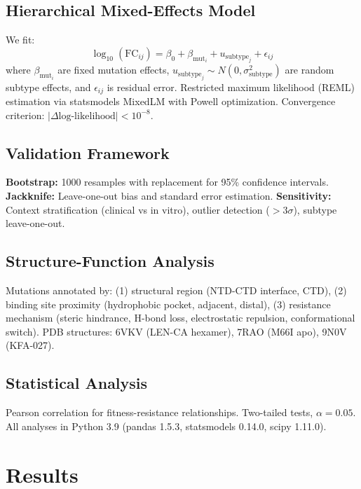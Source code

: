 \documentclass[preprint]{elsarticle}
\begin{document}
\subsection{Hierarchical Mixed-Effects Model}

We fit:
\begin{equation}
\log_{10}(\text{FC}_{ij}) = \beta_0 + \beta_{\text{mut}_i} + u_{\text{subtype}_j} + \epsilon_{ij}
\end{equation}
where $\beta_{\text{mut}_i}$ are fixed mutation effects, $u_{\text{subtype}_j} \sim N(0, \sigma^2_{\text{subtype}})$ are random subtype effects, and $\epsilon_{ij}$ is residual error. Restricted maximum likelihood (REML) estimation via statsmodels MixedLM with Powell optimization. Convergence criterion: $|\Delta\text{log-likelihood}| < 10^{-8}$.

\subsection{Validation Framework}

\textbf{Bootstrap:} 1000 resamples with replacement for 95\% confidence intervals. \textbf{Jackknife:} Leave-one-out bias and standard error estimation. \textbf{Sensitivity:} Context stratification (clinical vs in vitro), outlier detection ($>3\sigma$), subtype leave-one-out.

\subsection{Structure-Function Analysis}

Mutations annotated by: (1) structural region (NTD-CTD interface, CTD), (2) binding site proximity (hydrophobic pocket, adjacent, distal), (3) resistance mechanism (steric hindrance, H-bond loss, electrostatic repulsion, conformational switch). PDB structures: 6VKV (LEN-CA hexamer), 7RAO (M66I apo), 9N0V (KFA-027).

\subsection{Statistical Analysis}

Pearson correlation for fitness-resistance relationships. Two-tailed tests, $\alpha=0.05$. All analyses in Python 3.9 (pandas 1.5.3, statsmodels 0.14.0, scipy 1.11.0).

\section{Results}
\end{document}
